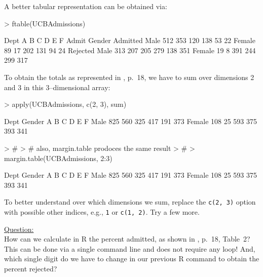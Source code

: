 \documentclass[12pt,letterpaper,final]{article}
\begin{document}
A better tabular representation can be obtained via:
\begin{Schunk}
\begin{Sinput}
> ftable(UCBAdmissions)
\end{Sinput}
\begin{Soutput}
                Dept   A   B   C   D   E   F
Admit    Gender                             
Admitted Male        512 353 120 138  53  22
         Female       89  17 202 131  94  24
Rejected Male        313 207 205 279 138 351
         Female       19   8 391 244 299 317
\end{Soutput}
\end{Schunk}

To obtain the totals as represented in \cite{FPP2007}, p.~18,
we have to sum over dimensions 2 and 3 in this 3--dimensional array:
\begin{Schunk}
\begin{Sinput}
> apply(UCBAdmissions, c(2, 3), sum)
\end{Sinput}
\begin{Soutput}
        Dept
Gender     A   B   C   D   E   F
  Male   825 560 325 417 191 373
  Female 108  25 593 375 393 341
\end{Soutput}
\begin{Sinput}
> #
> # also, margin.table prodoces the same result
> #
> margin.table(UCBAdmissions, 2:3)
\end{Sinput}
\begin{Soutput}
        Dept
Gender     A   B   C   D   E   F
  Male   825 560 325 417 191 373
  Female 108  25 593 375 393 341
\end{Soutput}
\end{Schunk}

To better understand over which dimensions we sum,
replace the \verb|c(2, 3)| option with possible
other indices, e.g., \verb|1| or \verb|c(1, 2)|.
Try a few more. \\
 

\newpage


\underline{Question:} \\
How can we calculate in R the percent admitted, as shown in 
\cite{FPP2007}, p.~18, Table~2? This can be done via
a single command line and does not require any loop!
And, which single digit do we have to change in our
previous R command to obtain the percent rejected?

\end{document}

